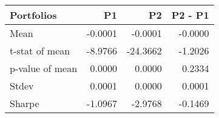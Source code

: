 \begin{tabular}{lrrr}
\toprule
Portfolios & P1 & P2 & P2 - P1 \\
\midrule
Mean & -0.0001 & -0.0001 & -0.0000 \\
t-stat of mean & -8.9766 & -24.3662 & -1.2026 \\
p-value of mean & 0.0000 & 0.0000 & 0.2334 \\
Stdev & 0.0001 & 0.0000 & 0.0001 \\
Sharpe & -1.0967 & -2.9768 & -0.1469 \\
\bottomrule
\end{tabular}
